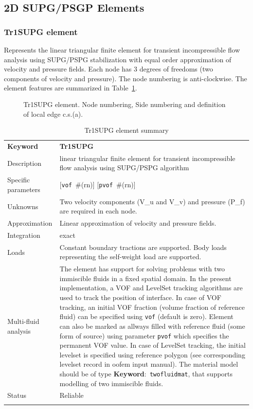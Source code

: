 \documentclass[a4paper]{article}
\newcommand{\descitem}[1]{{\noindent \textbf{#1}}:}
\newcommand{\elemkeyword}[1]{\descitem{Keyword}~\param{#1}} %
\newcommand{\param}[1]{\texttt{#1}} %
\newcommand{\optional}[1]{[#1]} %
\newcommand{\field}[2]{\param{#1}~\#{\tiny(#2)}} %
\newcommand{\optField}[2]{\optional{\field{#1}{#2}}}
\newcommand{\templabel}{}%
\newcommand{\tempcaption}{}%
\newcounter{nelpar}
\newenvironment{elementsummary}[5]{%
  \gdef\tempcaption{#4}%
  \gdef\templabel{#5}%
  \setcounter{nelpar}{0}%
  \begin{center} %
    \begin{table}[!htb] %
      \begin{tabular}{|l|p{9cm}|}\hline %
        {\bf Keyword} & \bf{#1}\\ %
        {Description} & {#2}\\ %
        {Specific parameters} & {#3}\\ \hline %
}{
  \\ \hline %
      \end{tabular}%
      \caption{\tempcaption}%
      \label{\templabel}%
    \end{table}%
  \end{center}%
}
\newcommand{\elementDescription}[2]{{#1} & {#2}\\}
\begin{document}
\clearpage
\subsection{2D SUPG/PSGP Elements}
\subsubsection{Tr1SUPG element}
\label{Tr1SUPG}
Represents the linear triangular finite element for transient
incompressible flow analysis using SUPG/PSPG stabilization with equal order
approximation of velocity and pressure fields. Each node has 3 degrees
of freedoms (two components of velocity and pressure).
The node numbering is anti-clockwise. The element features are summarized in Table~\ref{Tr1SUPGsummary}.

\begin{figure}[htb]
 \centering
 \begin{makeimage}
  
 \end{makeimage}
 \caption{Tr1SUPG element. Node numbering, Side numbering and
 definition of local edge c.s.(a).}
 \label{Tr1SUPG2fig}
\end{figure}

\begin{elementsummary}{Tr1SUPG}{linear triangular finite element for transient
incompressible flow analysis using SUPG/PSPG algorithm}{\optField{vof}{rn} \optField{pvof}{rn}}{Tr1SUPG element summary}{Tr1SUPGsummary}
\elementDescription{Unknowns}{Two velocity components (V\_u and V\_v) and pressure (P\_f) are required in each node.}
\elementDescription{Approximation}{Linear approximation of velocity and pressure fields.}
\elementDescription{Integration}{exact}
\elementDescription{Loads}{Constant boundary tractions are supported. Body loads
representing the self-weight load are supported.}
\elementDescription{Multi-fluid analysis}{The element has support for solving
problems with two immiscible fluids in
a fixed spatial domain. In the present implementation, a VOF and LevelSet tracking algorithms
are used to track the position of interface. In case of VOF tracking, an initial VOF fraction
(volume fraction of reference fluid) can be specified using
\param{vof} (default is zero). Element can also be marked as allways
filled with reference fluid (some form of source) using parameter
\param{pvof} which specifies the permanent VOF value. In case of LevelSet tracking, the initial levelset is specified using 
reference polygon (see corresponding levelset record in oofem input manual).
The material model should be of type \elemkeyword{twofluidmat}, that
supports modelling of two immiscible fluids.}
\elementDescription{Status}{Reliable}
\end{elementsummary}
\end{document}
